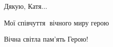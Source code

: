  
 
 
 
 

\qqSecCmt


Дякую, Катя...


Мої співчуття🙏 вічного миру герою


Вічна світла пам'ять Герою!
